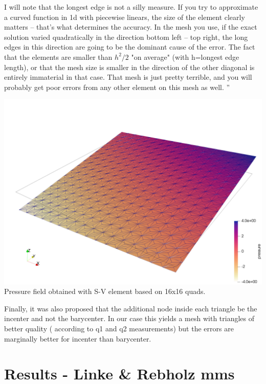 I will note that the longest edge is not a silly measure. If you try to
approximate a curved function in 1d with piecewise linears, the size of the
element clearly matters -- that's what determines the accuracy. In the mesh
you use, if the exact solution varied quadratically in the direction bottom
left -- top right, the long edges in this direction are going to be the
dominant cause of the error. The fact that the elements are smaller than $h^2/2$
"on average" (with h=longest edge length), or that the mesh size is smaller in
the direction of the other diagonal is entirely immaterial in that case. That
mesh is just pretty terrible, and you will probably get poor errors from any
other element on this mesh as well. 
''




\begin{center}
\includegraphics[width=14cm]{python_codes/fieldstone_120/paperresults/plin/press_SV}\\
{\captionfont Pressure field obtained with S-V element based on 16x16 quads.}
\end{center}

Finally, it was also proposed that the additional node inside each 
triangle be the incenter and not the barycenter. 
In our case this yields a mesh with triangles of better quality (
according to q1 and q2 measurements) but the errors are 
marginally better for incenter than barycenter.


\newpage
\section*{Results - Linke \& Rebholz mms }

